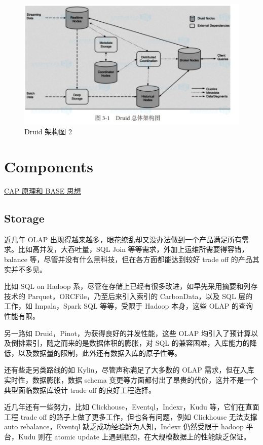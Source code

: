 \documentclass[hyperref, UTF-8]{ctexart}
\begin{document}
\begin{figure}[htbp]
\centering
\includegraphics[width=.9\linewidth]{PPTNote/Jietu20171129-154849_2017-11-29_15-50-31.jpg}
\caption{Druid 架构图 2}
\end{figure}

\section{Components}
\label{sec:orge6fe122}
\href{http://www.jdon.com/37625}{CAP 原理和 BASE 思想}
\subsection{Storage}
\label{sec:orgf0504f2}
近几年 OLAP 出现得越来越多，眼花缭乱却又没办法做到一个产品满足所有需求。比如高并发，大吞吐量，SQL Join 等等需求，外加上运维所需要得容错，balance 等，尽管并没有什么黑科技，但在各方面都能达到较好 trade off 的产品其实并不多见。

比如 SQL on Hadoop 系，尽管在存储上已经有很多改进，如早先采用摘要和列存技术的 Parquet，ORCFile，乃至后来引入索引的 CarbonData，以及 SQL 层的工作，如 Impala，Spark SQL 等等，受限于 Hadoop 本身，这些 OLAP 的查询性能有限。 

另一路如 Druid，Pinot，为获得良好的并发性能，这些 OLAP 均引入了预计算以及倒排索引，随之而来的是数据体积的膨胀，对 SQL 的兼容困难，入库能力的降低，以及数据量的限制，此外还有数据入库的原子性等。  

还有些走另类路线的如 Kylin，尽管声称满足了大多数的 OLAP 需求，但在入库实时性，数据膨胀，数据 schema 变更等方面都付出了昂贵的代价，这并不是一个典型面临数据库设计 trade off 的良好工程选择。  

近几年还有一些努力，比如 Clickhouse，Eventql，Indexr，Kudu 等，它们在直面工程 trade off 的路子上做了更多工作，但也各有问题，例如 Clickhouse 无法支撑 auto rebalance，Eventql 缺乏成功经验鲜为人知，Indexr 仍然受限于 hadoop 平台，Kudu 则在 atomic update 上遇到瓶颈，在大规模数据上的性能缺乏保证。  
\end{document}
